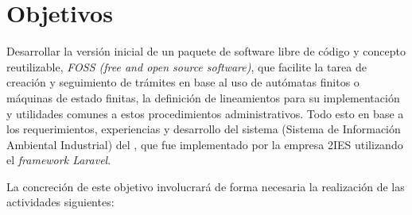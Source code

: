 \section{Objetivos}

Desarrollar la versión inicial de un paquete de software libre de código y
concepto reutilizable, \textit{FOSS (free and open source software)}, que facilite la
tarea de creación y seguimiento de trámites en base al uso de autómatas finitos
o máquinas de estado finitas, la definición de lineamientos para su
implementación y utilidades comunes a estos procedimientos administrativos. Todo
esto en base a los requerimientos, experiencias y desarrollo del sistema
 (Sistema de Información Ambiental Industrial) del , que fue implementado por la empresa
2IES utilizando el \textit{framework Laravel}.

La concreción de este objetivo involucrará de forma necesaria la realización de
las actividades siguientes:

